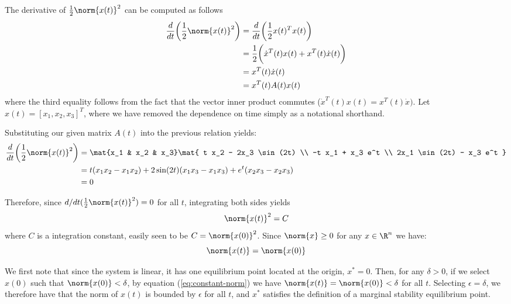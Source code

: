 \documentclass{homework}
\begin{document}
\begin{letterenum}

\item The derivative of $\frac{1}{2}\norm{x(t)}^2$ can be computed as follows
\begin{align*}
    \frac{d}{dt}\biggl(\frac{1}{2}\norm{x(t)}^2\biggr)
        &= \frac{d}{dt} \biggl(\frac{1}{2}x(t)^T x(t)\biggr) \\
        &= \frac{1}{2} \biggl(\dot{x}^T(t) x(t) + x^T(t) \dot{x}(t)\biggr) \\
        &= x^T(t) \dot{x}(t) \\
        &= x^T(t) A(t) x(t) \\
\end{align*}
where the third equality follows from the fact that the vector inner product
commutes ($\dot{x}^T(t) x(t) = x^T(t) \dot{x})$. Let $x(t) = [x_1, x_2, x_3]^T$,
where we have removed the dependence on time simply as a notational shorthand.

Substituting our given matrix $A(t)$ into the previous relation yields:
\begin{align*}
    \frac{d}{dt}\biggl(\frac{1}{2} \norm{x(t)}^2\biggr) &=
        \mat{x_1 & x_2 & x_3} \mat{
            t x_2 - 2x_3 \sin (2t) \\
            -t x_1 + x_3 e^t \\
            2x_1 \sin (2t) - x_3 e^t
        } \\
        &= t(x_1x_2 - x_1x_2) + 2\sin(2t) (x_1x_3 - x_1x_3) + e^t (x_2x_3 - x_2x_3) \\
        &= 0
\end{align*}

Therefore, since $d/dt(\frac{1}{2}\norm{x(t)}^2) = 0$ for all $t$,
integrating both sides yields
\begin{equation*}
    \norm{x(t)}^2 = C
\end{equation*}
where $C$ is a integration constant, easily seen to be $C = \norm{x(0)}^2$.
Since $\norm{x} \geq 0$ for any $x\in\R^n$ we have:
\begin{equation}
    \norm{x(t)} = \norm{x(0)}
    \label{eq:constant-norm}
\end{equation}

\item We first note that since the system is linear, it has one
equilibrium point located at the origin, $x^* = 0$.
Then, for any $\delta > 0$, if we select $x(0)$ such that $\norm{x(0)} < \delta$,
by equation (\ref{eq:constant-norm}) we have $\norm{x(t)} = \norm{x(0)} < \delta$
for all $t$. Selecting $\epsilon = \delta$, we therefore have that the norm
of $x(t)$ is bounded by $\epsilon$ for all $t$, and $x^*$ satisfies the definition
of a marginal stability equilibrium point.


\end{letterenum}
\end{document}
